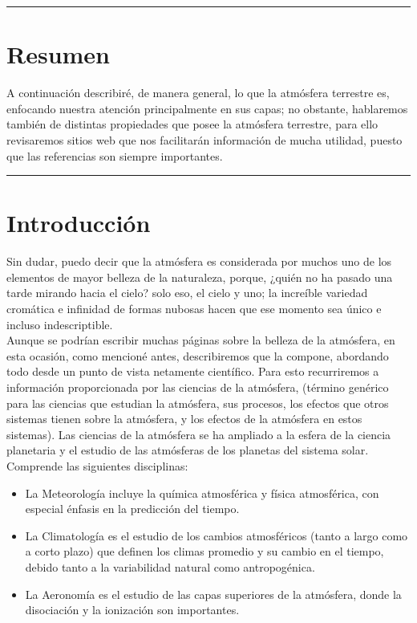 \documentclass{article}
\begin{document}
\pagebreak
\begin{doublespace}

\hrule
\section*{Resumen}
A continuación describiré, de manera general, lo que la atmósfera terrestre es, enfocando nuestra atención principalmente en sus capas; no obstante, hablaremos también de distintas propiedades que posee la atmósfera terrestre, para ello revisaremos sitios web que nos facilitarán información de mucha utilidad, puesto que las referencias son siempre importantes.
\vspace{0.5 cm}
\hrule
\vspace{0.6 cm}
\section{Introducción}
Sin dudar, puedo decir que la atmósfera es considerada por muchos uno de los elementos de mayor belleza de la naturaleza, porque, ¿quién no ha pasado una tarde mirando hacia el cielo? solo eso, el cielo y uno; la increíble variedad cromática e infinidad de formas nubosas hacen que ese momento sea único e incluso indescriptible.
\\
Aunque se podrían escribir muchas páginas sobre la belleza de la atmósfera, en esta ocasión, como mencioné antes, describiremos que la compone, abordando todo desde un punto de vista netamente científico. Para esto recurriremos a información proporcionada por las ciencias de la atmósfera, (término genérico para las ciencias que estudian la atmósfera, sus procesos, los efectos que otros sistemas tienen sobre la atmósfera, y los efectos de la atmósfera en estos sistemas). Las ciencias de la atmósfera se ha ampliado a la esfera de la ciencia planetaria y el estudio de las atmósferas de los planetas del sistema solar. Comprende las siguientes disciplinas:
\begin{itemize}
    \item La Meteorología incluye la química atmosférica y física atmosférica, con especial énfasis en la predicción del tiempo.
    \item La Climatología es el estudio de los cambios atmosféricos (tanto a largo como a corto plazo) que definen los climas promedio y su cambio en el tiempo, debido tanto a la variabilidad natural como antropogénica.
    \item	La Aeronomía es el estudio de las capas superiores de la atmósfera, donde la disociación y la ionización son importantes.    
\end{itemize}


\end{doublespace}
\end{document}
